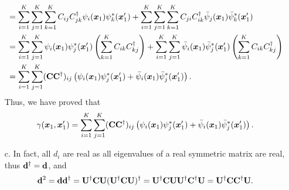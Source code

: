 \documentclass[a4paper]{book}
\newcommand{\C}{{\bf C}}
\newcommand{\U}{{\bf U}}
\begin{document}
\begin{solution}
\begin{enumerate}
\begin{align*}
		&= \sum_{ i=1 }^K \sum_{ j=1 }^K \sum_{ k=1 }^K C_{ij} C^\dagger_{jk} \psi_i( \boldsymbol{x}_1 ) \psi^*_k( \boldsymbol{x}^\prime_1 ) + \sum_{ i=1 }^K \sum_{ j=1 }^K \sum_{ k=1 }^K C_{ji} C^\dagger_{ik} \bar{\psi}_j( \boldsymbol{x}_1 ) \bar{\psi}^*_k( \boldsymbol{x}^\prime_1 ) \\
		&= \sum_{ i=1 }^K \sum_{ j=1 }^K \psi_i( \boldsymbol{x}_1 ) \psi^*_j( \boldsymbol{x}^\prime_1 ) \left( \sum_{ k=1 }^K C_{ik} C^\dagger_{kj} \right)  + \sum_{ i=1 }^K \sum_{ j=1 }^K  \bar{\psi}_i( \boldsymbol{x}_1 ) \bar{\psi}^*_j( \boldsymbol{x}^\prime_1 ) \left( \sum_{ k=1 }^K C_{ik} C^\dagger_{kj} \right)\\
		&= \sum_{ i=1 }^K \sum_{ j=1 }^K (\C \C^\dagger)_{ij} \left( \psi_i( \boldsymbol{x}_1 ) \psi^*_j( \boldsymbol{x}^\prime_1 ) + \bar{\psi}_i( \boldsymbol{x}_1 ) \bar{\psi}^*_j( \boldsymbol{x}^\prime_1 ) \right).
	\end{align*}
	Thus, we have proved that
	\begin{equation}
		\gamma( \boldsymbol{x}_1 , \boldsymbol{x}^\prime_1 ) = \sum_{ i=1 }^K \sum_{ j=1 }^K (\C \C^\dagger)_{ij} \left( \psi_i( \boldsymbol{x}_1 ) \psi^*_j( \boldsymbol{x}^\prime_1 ) + \bar{\psi}_i( \boldsymbol{x}_1 ) \bar{\psi}^*_j( \boldsymbol{x}^\prime_1 ) \right).
	\end{equation}
	
	\item[c.] In fact, all $d_i$ are real as all eigenvalues of a real symmetric matrix are real, thus ${\bf d}^\dagger = {\bf d}$, and
	\begin{equation}
		{\bf d}^2 = {\bf d}{\bf d}^\dagger = \U^\dagger \C \U (\U^\dagger \C \U)^\dagger = \U^\dagger \C \U \U^\dagger \C^\dagger \U = \U^\dagger \C \C^\dagger \U.
	\end{equation}
	

\end{enumerate}
\end{solution}
\end{document}
